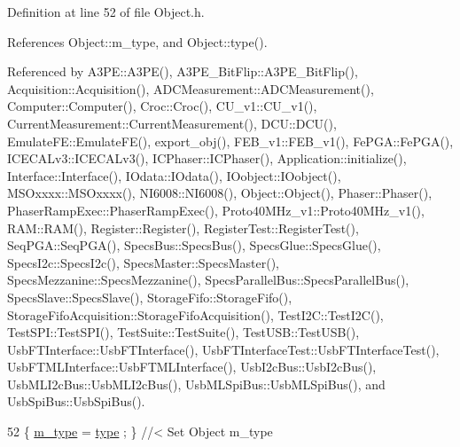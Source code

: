 Definition at line 52 of file Object.\+h.



References Object\+::m\+\_\+type, and Object\+::type().



Referenced by A3\+P\+E\+::\+A3\+P\+E(), A3\+P\+E\+\_\+\+Bit\+Flip\+::\+A3\+P\+E\+\_\+\+Bit\+Flip(), Acquisition\+::\+Acquisition(), A\+D\+C\+Measurement\+::\+A\+D\+C\+Measurement(), Computer\+::\+Computer(), Croc\+::\+Croc(), C\+U\+\_\+v1\+::\+C\+U\+\_\+v1(), Current\+Measurement\+::\+Current\+Measurement(), D\+C\+U\+::\+D\+C\+U(), Emulate\+F\+E\+::\+Emulate\+F\+E(), export\+\_\+obj(), F\+E\+B\+\_\+v1\+::\+F\+E\+B\+\_\+v1(), Fe\+P\+G\+A\+::\+Fe\+P\+G\+A(), I\+C\+E\+C\+A\+Lv3\+::\+I\+C\+E\+C\+A\+Lv3(), I\+C\+Phaser\+::\+I\+C\+Phaser(), Application\+::initialize(), Interface\+::\+Interface(), I\+Odata\+::\+I\+Odata(), I\+Oobject\+::\+I\+Oobject(), M\+S\+Oxxxx\+::\+M\+S\+Oxxxx(), N\+I6008\+::\+N\+I6008(), Object\+::\+Object(), Phaser\+::\+Phaser(), Phaser\+Ramp\+Exec\+::\+Phaser\+Ramp\+Exec(), Proto40\+M\+Hz\+\_\+v1\+::\+Proto40\+M\+Hz\+\_\+v1(), R\+A\+M\+::\+R\+A\+M(), Register\+::\+Register(), Register\+Test\+::\+Register\+Test(), Seq\+P\+G\+A\+::\+Seq\+P\+G\+A(), Specs\+Bus\+::\+Specs\+Bus(), Specs\+Glue\+::\+Specs\+Glue(), Specs\+I2c\+::\+Specs\+I2c(), Specs\+Master\+::\+Specs\+Master(), Specs\+Mezzanine\+::\+Specs\+Mezzanine(), Specs\+Parallel\+Bus\+::\+Specs\+Parallel\+Bus(), Specs\+Slave\+::\+Specs\+Slave(), Storage\+Fifo\+::\+Storage\+Fifo(), Storage\+Fifo\+Acquisition\+::\+Storage\+Fifo\+Acquisition(), Test\+I2\+C\+::\+Test\+I2\+C(), Test\+S\+P\+I\+::\+Test\+S\+P\+I(), Test\+Suite\+::\+Test\+Suite(), Test\+U\+S\+B\+::\+Test\+U\+S\+B(), Usb\+F\+T\+Interface\+::\+Usb\+F\+T\+Interface(), Usb\+F\+T\+Interface\+Test\+::\+Usb\+F\+T\+Interface\+Test(), Usb\+F\+T\+M\+L\+Interface\+::\+Usb\+F\+T\+M\+L\+Interface(), Usb\+I2c\+Bus\+::\+Usb\+I2c\+Bus(), Usb\+M\+L\+I2c\+Bus\+::\+Usb\+M\+L\+I2c\+Bus(), Usb\+M\+L\+Spi\+Bus\+::\+Usb\+M\+L\+Spi\+Bus(), and Usb\+Spi\+Bus\+::\+Usb\+Spi\+Bus().


\begin{DoxyCode}
52 \{ \hyperlink{classObject_a457a600fe8c00eb1034374f75110a78c}{m\_type}  = \hyperlink{classObject_a84f99f70f144a83e1582d1d0f84e4e62}{type}  ; \} \textcolor{comment}{//< Set Object m\_type}
\end{DoxyCode}
\mbox{\label{classHisto1D_acc0d6f2080b0cfafc85ebc49cf0efc31}} 
